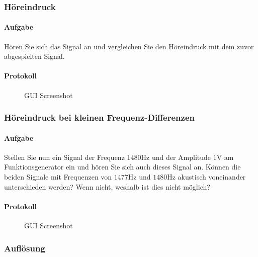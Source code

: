 \documentclass[10pt]{report}
\begin{document}
        \subsubsection{Höreindruck}
        \paragraph{Aufgabe}
        Hören Sie sich das Signal an und vergleichen Sie den Höreindruck mit dem zuvor
        abgespielten Signal.
        \paragraph{Protokoll}
        \begin{center}
            \begin{figure}[H]
              \caption{GUI Screenshot}
            \end{figure}
        \end{center}

        \subsubsection{Höreindruck bei kleinen Frequenz-Differenzen}
        \paragraph{Aufgabe}
        Stellen Sie nun ein Signal der Frequenz $1480\si{\hertz}$ und der Amplitude $1\si{\volt}$ am Funktionsgenerator
        ein und hören Sie sich auch dieses Signal an. Können die beiden
        Signale mit Frequenzen von $1477\si{\hertz}$ und $1480\si{\hertz}$ akustisch voneinander unterschieden
        werden? Wenn nicht, weshalb ist dies nicht möglich?
        \paragraph{Protokoll}
        \begin{center}
            \begin{figure}[H]
              \caption{GUI Screenshot}
            \end{figure}
        \end{center}

        \subsubsection{Auflösung}
\end{document}
